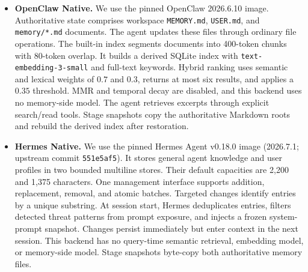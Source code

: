 \documentclass[letterpaper]{article}
\begin{document}
\begin{itemize}
    \item \textbf{OpenClaw Native.} We use the pinned OpenClaw 2026.6.10 image. Authoritative state comprises workspace \texttt{MEMORY.md}, \texttt{USER.md}, and \texttt{memory/*.md} documents. The agent updates these files through ordinary file operations. The built-in index segments documents into 400-token chunks with 80-token overlap. It builds a derived SQLite index with \texttt{text-embedding-3-small} and full-text keywords. Hybrid ranking uses semantic and lexical weights of \(0.7\) and \(0.3\), returns at most six results, and applies a \(0.35\) threshold. MMR and temporal decay are disabled, and this backend uses no memory-side model. The agent retrieves excerpts through explicit search/read tools. Stage snapshots copy the authoritative Markdown roots and rebuild the derived index after restoration.

    \item \textbf{Hermes Native.} We use the pinned Hermes Agent v0.18.0 image (2026.7.1; upstream commit \texttt{551e5af5}). It stores general agent knowledge and user profiles in two bounded multiline stores. Their default capacities are 2,200 and 1,375 characters. One management interface supports addition, replacement, removal, and atomic batches. Targeted changes identify entries by a unique substring. At session start, Hermes deduplicates entries, filters detected threat patterns from prompt exposure, and injects a frozen system-prompt snapshot. Changes persist immediately but enter context in the next session. This backend has no query-time semantic retrieval, embedding model, or memory-side model. Stage snapshots byte-copy both authoritative memory files.


\end{itemize}
\end{document}
